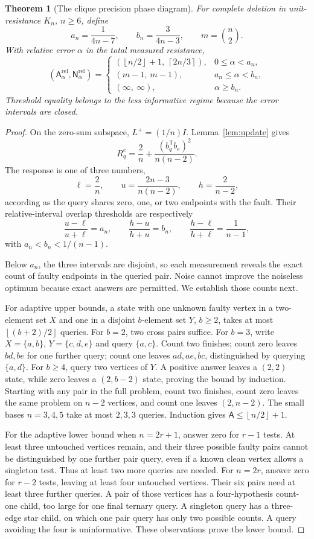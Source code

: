 \documentclass[11pt,letterpaper]{article}
\newtheorem{theorem}{Theorem}
\newcommand{\ceil}[1]{\left\lceil #1\right\rceil}
\newcommand{\floor}[1]{\left\lfloor #1\right\rfloor}
\newcommand{\A}{\mathsf A}
\newcommand{\N}{\mathsf N}
\begin{document}
\begin{theorem}[The clique precision phase diagram]\label{thm:clique}
For complete deletion in unit-resistance $K_n$, $n\ge6$, define
\[
 a_n=\frac1{4n-7},\qquad b_n=\frac3{4n-3},\qquad m=\binom n2.
\]
With relative error $\alpha$ in the total measured resistance,
\[
 (\A^{\mathrm{rel}}_\alpha,\N^{\mathrm{rel}}_\alpha)=
 \begin{cases}
  (\floor{n/2}+1,\ \ceil{2n/3}),&0\le\alpha<a_n,\\
  (m-1,\ m-1),&a_n\le\alpha<b_n,\\
  (\infty,\ \infty),&\alpha\ge b_n.
 \end{cases}
\]
Threshold equality belongs to the less informative regime because the error intervals are closed.
\end{theorem}
\begin{proof}
On the zero-sum subspace, $L^+=(1/n)I$. Lemma~\ref{lem:update} gives
\[
 R_q^e=\frac2n+\frac{(b_q^{\mathsf T}b_e)^2}{n(n-2)}.
\]
The response is one of three numbers,
\[
 \ell=\frac2n,\qquad u=\frac{2n-3}{n(n-2)},\qquad
 h=\frac2{n-2},
\]
according as the query shares zero, one, or two endpoints with the fault. Their relative-interval overlap thresholds are respectively
\[
 \frac{u-\ell}{u+\ell}=a_n,\qquad
 \frac{h-u}{h+u}=b_n,\qquad
 \frac{h-\ell}{h+\ell}=\frac1{n-1},
\]
with $a_n<b_n<1/(n-1)$.

Below $a_n$, the three intervals are disjoint, so each measurement reveals the exact count of faulty endpoints in the queried pair. Noise cannot improve the noiseless optimum because exact answers are permitted. We establish those counts next.

For adaptive upper bounds, a state with one unknown faulty vertex in a two-element set $X$ and one in a disjoint $b$-element set $Y$, $b\ge2$, takes at most $\floor{(b+2)/2}$ queries. For $b=2$, two cross pairs suffice. For $b=3$, write $X=\{a,b\}$, $Y=\{c,d,e\}$ and query $\{a,c\}$. Count two finishes; count zero leaves $bd,be$ for one further query; count one leaves $ad,ae,bc$, distinguished by querying $\{a,d\}$. For $b\ge4$, query two vertices of $Y$. A positive answer leaves a $(2,2)$ state, while zero leaves a $(2,b-2)$ state, proving the bound by induction. Starting with any pair in the full problem, count two finishes, count zero leaves the same problem on $n-2$ vertices, and count one leaves $(2,n-2)$. The small bases $n=3,4,5$ take at most $2,3,3$ queries. Induction gives $\A\le\floor{n/2}+1$.

For the adaptive lower bound when $n=2r+1$, answer zero for $r-1$ tests. At least three untouched vertices remain, and their three possible faulty pairs cannot be distinguished by one further pair query, even if a known clean vertex allows a singleton test. Thus at least two more queries are needed. For $n=2r$, answer zero for $r-2$ tests, leaving at least four untouched vertices. Their six pairs need at least three further queries. A pair of those vertices has a four-hypothesis count-one child, too large for one final ternary query. A singleton query has a three-edge star child, on which one pair query has only two possible counts. A query avoiding the four is uninformative. These observations prove the lower bound.


\end{proof}
\end{document}
